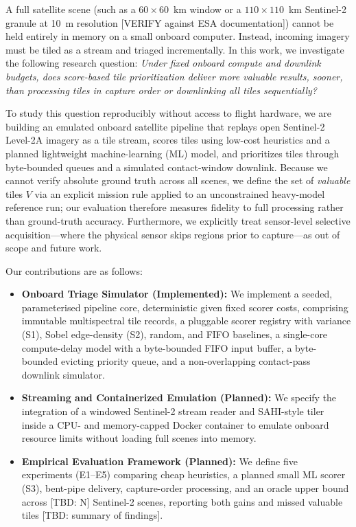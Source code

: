 \documentclass[conference]{IEEEtran}
\begin{document}
A full satellite scene (such as a $60\times60$~km window or a $110\times110$~km Sentinel-2 granule at 10~m resolution [VERIFY against ESA documentation]) cannot be held entirely in memory on a small onboard computer. Instead, incoming imagery must be tiled as a stream and triaged incrementally. In this work, we investigate the following research question: \emph{Under fixed onboard compute and downlink budgets, does score-based tile prioritization deliver more valuable results, sooner, than processing tiles in capture order or downlinking all tiles sequentially?}

To study this question reproducibly without access to flight hardware, we are building an emulated onboard satellite pipeline that replays open Sentinel-2 Level-2A imagery as a tile stream, scores tiles using low-cost heuristics and a planned lightweight machine-learning (ML) model, and prioritizes tiles through byte-bounded queues and a simulated contact-window downlink. Because we cannot verify absolute ground truth across all scenes, we define the set of \emph{valuable} tiles $V$ via an explicit mission rule applied to an unconstrained heavy-model reference run; our evaluation therefore measures fidelity to full processing rather than ground-truth accuracy. Furthermore, we explicitly treat sensor-level selective acquisition---where the physical sensor skips regions prior to capture---as out of scope and future work.

Our contributions are as follows:
\begin{itemize}
    \item \textbf{Onboard Triage Simulator (Implemented):} We implement a seeded, parameterised pipeline core, deterministic given fixed scorer costs, comprising immutable multispectral tile records, a pluggable scorer registry with variance (S1), Sobel edge-density (S2), random, and FIFO baselines, a single-core compute-delay model with a byte-bounded FIFO input buffer, a byte-bounded evicting priority queue, and a non-overlapping contact-pass downlink simulator.
    \item \textbf{Streaming and Containerized Emulation (Planned):} We specify the integration of a windowed Sentinel-2 stream reader and SAHI-style tiler~\cite{sahi} inside a CPU- and memory-capped Docker container to emulate onboard resource limits without loading full scenes into memory.
    \item \textbf{Empirical Evaluation Framework (Planned):} We define five experiments (E1--E5) comparing cheap heuristics, a planned small ML scorer (S3), bent-pipe delivery, capture-order processing, and an oracle upper bound across [TBD: N] Sentinel-2 scenes, reporting both gains and missed valuable tiles [TBD: summary of findings].
\end{itemize}
\end{document}
